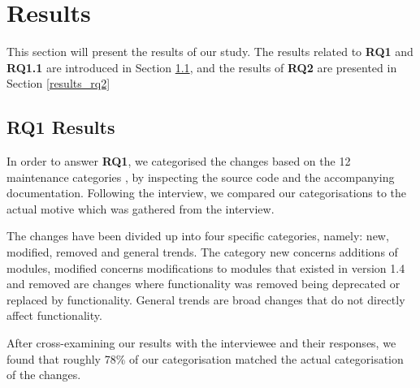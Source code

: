 \documentclass{sig-alternate}
\begin{document}


\section{Results} \label{results}
This section will present the results of our study. The results related to \textbf{RQ1} and \textbf{RQ1.1} are introduced in Section \ref{results_rq1}, and the results of \textbf{RQ2} are presented in Section \ref{results_rq2}



\subsection{RQ1 Results} \label{results_rq1}


In order to answer \textbf{RQ1}, we categorised the changes based on the 12 maintenance categories \cite{chapin2001types}, by inspecting the source code and the accompanying documentation. Following the interview, we compared our categorisations to the actual motive which was gathered from the interview. 

The changes have been divided up into four specific categories, namely: new, modified, removed and general trends. The category new concerns additions of modules, modified concerns modifications to modules that existed in version 1.4 and removed are changes where functionality was removed being deprecated or replaced by functionality. General trends are broad changes that do not directly affect functionality. 

After cross-examining our results with the interviewee and their responses, we found that roughly 78\% of our categorisation matched the actual categorisation of the changes.


\end{document}
